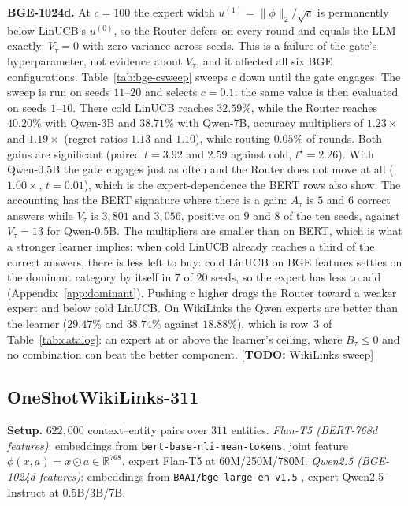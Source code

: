 \documentclass{article}
\theoremstyle{definition}
\theoremstyle{remark}
\theoremstyle{remark}
\newcommand{\todo}[1]{\textcolor{red!70!black}{[\textbf{TODO:} #1]}}
\begin{document}
\textbf{BGE-1024d.} At $c=100$ the expert width $u^{(1)}=\|\phi\|_2/\sqrt c$
is permanently below LinUCB's $u^{(0)}$, so the Router defers on every round
and equals the LLM exactly: $V_\tau=0$ with zero variance across seeds. This
is a failure of the gate's hyperparameter, not evidence about $V_\tau$, and it
affected all six BGE configurations. Table~\ref{tab:bge-csweep} sweeps $c$
down until the gate engages. The sweep is run on seeds $11$--$20$ and selects
$c=0.1$; the same value is then evaluated on seeds $1$--$10$. There cold LinUCB
reaches $32.59\%$, while the Router reaches $40.20\%$ with Qwen-3B and
$38.71\%$ with Qwen-7B, accuracy multipliers of $1.23\times$ and $1.19\times$
(regret ratios $1.13$ and $1.10$), while routing $0.05\%$ of rounds. Both gains
are significant (paired $t=3.92$ and $2.59$ against cold, $t^\star=2.26$). With
Qwen-0.5B the gate engages just as often and the Router does not move at all
($1.00\times$, $t=0.01$), which is the expert-dependence the BERT rows also
show. The accounting has the BERT signature where there is a gain: $A_\tau$ is
$5$ and $6$ correct answers while $V_\tau$ is $3{,}801$ and $3{,}056$, positive
on $9$ and $8$ of the ten seeds, against $V_\tau=13$ for Qwen-0.5B. The
multipliers are smaller than on BERT, which is what a stronger learner implies:
when cold LinUCB already reaches a third of the correct answers, there is less
left to buy: cold LinUCB on BGE features settles on the dominant category
by itself in $7$ of $20$ seeds, so the expert has less to add
(Appendix~\ref{app:dominant}). Pushing $c$ higher
drags the Router toward a weaker expert and below cold LinUCB. On WikiLinks
the Qwen experts are better than the learner ($29.47\%$ and $38.74\%$ against
$18.88\%$), which is row~3 of Table~\ref{tab:catalog}: an expert at or above the
learner's ceiling, where $B_\tau\le0$ and no combination can beat the better
component. \todo{WikiLinks sweep}

\subsection{OneShotWikiLinks-311}
\label{app:wiki}

\textbf{Setup.} $622{,}000$ context--entity pairs over $311$ entities.
\emph{Flan-T5 (BERT-768d features)}: embeddings from
\texttt{bert-base-nli-mean-tokens}, joint feature $\phi(x,a)=x\odot a\in\mathbb R^{768}$,
expert Flan-T5 \cite{chung2024scaling} at 60M/250M/780M.
\emph{Qwen2.5 (BGE-1024d features)}: embeddings from
\texttt{BAAI/bge-large-en-v1.5} \cite{xiao2024c}, expert Qwen2.5-Instruct
\cite{hui2024qwen2} at 0.5B/3B/7B.
\end{document}
